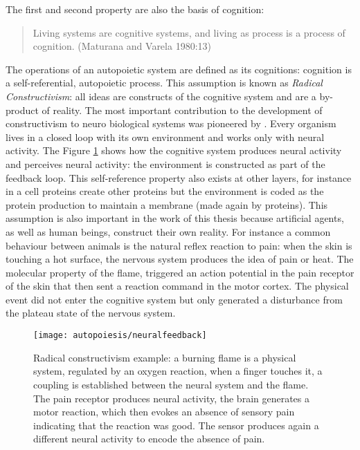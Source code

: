 The first and second property are also the basis of cognition:
\begin{quote}
Living systems are cognitive systems, and living as process is a process of cognition.
(Maturana and Varela 1980:13)
\end{quote}
The operations of an autopoietic system are defined as its cognitions: cognition is
a self-referential, autopoietic process.
This assumption is known as \textit{Radical Constructivism}:
all ideas are constructs of the cognitive system and are a by-product of reality.
The most important contribution to the development of constructivism to neuro biological
 systems was pioneered by \citet{VanFoerster2003:Cybernetics}.
Every organism lives in a closed loop with its own environment and works only with neural activity.
The Figure \ref{Fig:Autopoiesis:Radical} shows how the cognitive system produces neural activity and
perceives neural activity: the environment is constructed as part of the feedback loop.
This self-reference property also exists at other layers, for instance in a cell 
proteins create other proteins but the environment is coded as the protein production 
to maintain a membrane (made again by proteins).
This assumption is also important in the work of this thesis because artificial
agents, as well as human beings, construct their own reality. For instance a common behaviour
between animals is the natural reflex reaction to pain: when the skin is touching a
hot surface, the nervous system produces the idea of pain or heat.
The molecular property of the flame, triggered an action potential in the pain
receptor of the skin that then sent a reaction command in the motor cortex.
The physical event did not enter the cognitive system but only generated
a disturbance from the plateau state of the nervous system.

\begin{figure}[htbp]
\begin{center}
\texttt{[image: autopoiesis/neuralfeedback]}
\end{center}
\small{
\caption[Radical constructivism example]{Radical constructivism example:
a burning flame is a physical system,
regulated by an oxygen reaction, when a finger touches it, a coupling is established
between the neural system and the flame.
The pain receptor produces neural activity, the brain generates a motor reaction, which then
 evokes an absence of sensory pain indicating that the reaction was good. 
The sensor produces again a different neural activity to encode the absence of pain.
\label{Fig:Autopoiesis:Radical}}}
\end{figure}

